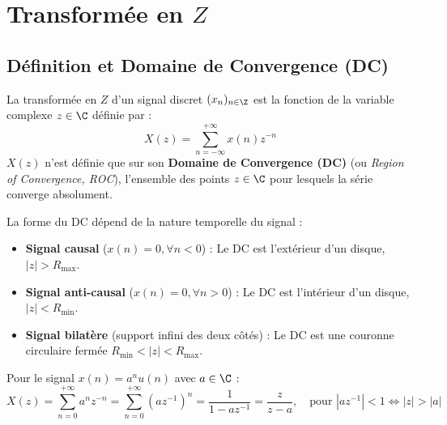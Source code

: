 \minitoc 


\section{Transformée en $Z$}

\subsection{Définition et Domaine de Convergence (DC)}

\begin{definition}[Transformée en $Z$]
    La transformée en $Z$ d'un signal discret $(x_n)_{n \in \Z}$ est la fonction de la variable complexe $z \in \C$ définie par :
        \begin{equation}
            \boxed{X(z) = \sum_{n=-\infty}^{+\infty} x(n) z^{-n}}
        \end{equation}
    $X(z)$ n'est définie que sur son \textbf{Domaine de Convergence (DC)} (ou \emph{Region of Convergence, ROC}), l'ensemble des points $z \in \C$ pour lesquels la série converge absolument.
\end{definition}

\begin{prop}
    La forme du DC dépend de la nature temporelle du signal :
    \begin{itemize}
        \item \textbf{Signal causal} ($x(n) = 0, \forall n < 0$) : Le DC est l'extérieur d'un disque, $|z| > R_{\max}$.
        \item \textbf{Signal anti-causal} ($x(n) = 0, \forall n > 0$) : Le DC est l'intérieur d'un disque, $|z| < R_{\min}$.
        \item \textbf{Signal bilatère} (support infini des deux côtés) : Le DC est une couronne circulaire fermée $R_{\min} < |z| < R_{\max}$.
    \end{itemize}
\end{prop}

\begin{example}
    Pour le signal $x(n) = a^n u(n)$ avec $a \in \C$ :
    $$ X(z) = \sum_{n=0}^{+\infty} a^n z^{-n} = \sum_{n=0}^{+\infty} (a z^{-1})^n = \frac{1}{1 - a z^{-1}} = \frac{z}{z - a}, \quad \text{pour } |a z^{-1}| < 1 \iff |z| > |a| $$
\end{example}

